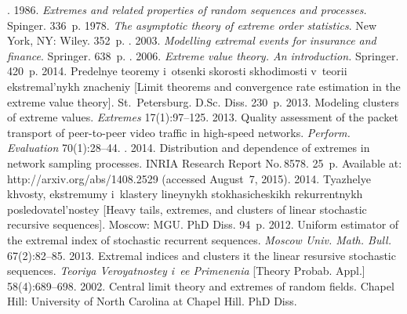   \begin{multicols}{2}

\renewcommand{\bibname}{\protect\rmfamily References}

{\small\frenchspacing
 {%
 \begin{thebibliography}{99}
.
1986. \textit{Extremes and related properties
of random sequences and processes.} Spinger. 336~p.
 1978. \textit{The asymptotic
theory of extreme order statistics}. New York, NY: Wiley. 352~p.
.
2003. \textit{Modelling
extremal events for insurance and finance}. Springer. 638~p.
.
2006. \textit{Extreme value theory. An introduction.} Springer. 420~p.
 2014. Predelnye teoremy i~otsenki
skorosti skhodimosti v~teorii ekstremal'nykh znacheniy
[Limit theorems and convergence rate estimation in the extreme value theory].
 St.\ Petersburg.  D.Sc. Diss. 230~p.
 2013. Modeling clusters of extreme values.
\textit{Extremes} 17(1):97--125.
 2013.
Quality assessment of the packet transport of peer-to-peer video traffic
in high-speed networks. \textit{Perform. Evaluation} 70(1):28--44.
.
2014. Distribution and dependence of extremes
in network sampling processes. INRIA Research Report No.\,8578. 25~p.
Available at: {http://arxiv.org/abs/1408.2529} (accessed August~7, 2015).
 2014. Tyazhelye khvosty, ekstremumy i~klastery lineynykh
stokhasicheskikh rekurrentnykh
posledovatel'nostey [Heavy tails, extremes, and clusters of linear stochastic
recursive sequences].
 Moscow: MGU.  PhD Diss. 94~p.
 2012. Uniform estimator of the extremal
index of stochastic recurrent sequences.
\textit{Moscow Univ. Math. Bull.} 67(2):82--85.
 2013. Extremal indices and clusters
it the linear resursive stochastic sequences. 
\textit{Teoriya Ve\-ro\-yat\-no\-stey i~ee Primenenia}
[Theory Probab. Appl.] 58(4):689--698.
 2002. Central limit theory and extremes of random fields.
 Chapel Hill: University of North Carolina at Chapel Hill. PhD Diss.

\end{thebibliography}}}
\end{multicols}
